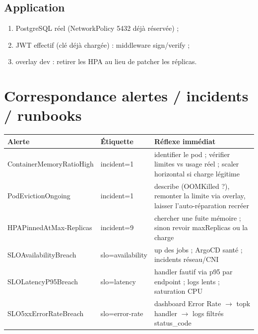 \documentclass[12pt,a4paper,twoside,openright]{report}
\begin{document}
\section{Application}
\begin{enumerate}[itemsep=1pt]
  \item PostgreSQL réel (NetworkPolicy 5432 déjà réservée) ;
  \item JWT effectif (clé déjà chargée) : middleware sign/verify ;
  \item overlay dev : retirer les HPA au lieu de patcher les réplicas.
\end{enumerate}

\chapter{Correspondance alertes / incidents / runbooks}

\begin{center}\label{tab:an-correspondance-alertes-incidents-runbooks}\end{center}
\begin{longtable}{@{}p{4.4cm}p{2.6cm}p{7.0cm}@{}}
\toprule
\textbf{Alerte} & \textbf{Étiquette} & \textbf{Réflexe immédiat} \\
\midrule
\endhead
ContainerMemoryRatio\newline High & incident=1 & identifier le pod ; vérifier limites vs usage réel ; scaler horizontal si charge légitime \\
PodEvictionOngoing & incident=1 & describe (OOMKilled ?), remonter la limite via overlay, laisser l'auto-réparation recréer \\
HPAPinnedAtMax-\newline Replicas & incident=9 & chercher une fuite mémoire ; sinon revoir maxReplicas ou la charge \\
SLOAvailabilityBreach & slo=availability & up des jobs ; ArgoCD santé ; incidents réseau/CNI \\
SLOLatencyP95Breach & slo=latency & handler fautif via p95 par endpoint ; logs lents ; saturation CPU \\
SLO5xxErrorRateBreach & slo=error-rate & dashboard Error Rate $\rightarrow$ topk handler $\rightarrow$ logs filtrés status\_code \\
\bottomrule
\end{longtable}

\end{document}

